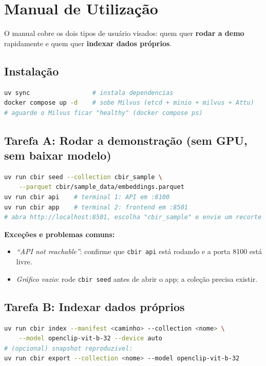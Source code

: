 \documentclass[10pt]{article}
\begin{document}
\section{Manual de Utilização}

O manual cobre os dois tipos de usuário visados: quem quer \textbf{rodar a
demo} rapidamente e quem quer \textbf{indexar dados próprios}.

\subsection{Instalação}

\begin{lstlisting}[language=bash]
uv sync                 # instala dependencias
docker compose up -d    # sobe Milvus (etcd + minio + milvus + Attu)
# aguarde o Milvus ficar "healthy" (docker compose ps)
\end{lstlisting}

\subsection{Tarefa A: Rodar a demonstração (sem GPU, sem baixar modelo)}

\begin{lstlisting}[language=bash]
uv run cbir seed --collection cbir_sample \
    --parquet cbir/sample_data/embeddings.parquet
uv run cbir api    # terminal 1: API em :8100
uv run cbir app    # terminal 2: frontend em :8501
# abra http://localhost:8501, escolha "cbir_sample" e envie um recorte
\end{lstlisting}

\noindent\textbf{Exceções e problemas comuns:}
\begin{itemize}
  \item \emph{``API not reachable''}: confirme que \texttt{cbir api} está
  rodando e a porta 8100 está livre.
  \item \emph{Gráfico vazio}: rode \texttt{cbir seed} antes de abrir o app; a
  coleção precisa existir.
\end{itemize}

\subsection{Tarefa B: Indexar dados próprios}

\begin{lstlisting}[language=bash]
uv run cbir index --manifest <caminho> --collection <nome> \
    --model openclip-vit-b-32 --device auto
# (opcional) snapshot reproduzivel:
uv run cbir export --collection <nome> --model openclip-vit-b-32
\end{lstlisting}
\end{document}

